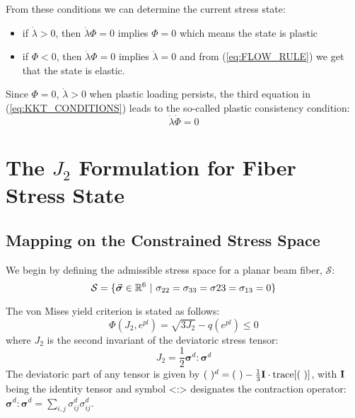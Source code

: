 From these conditions we can determine the current stress state:
\begin{itemize}
	\item if $\dot{\lambda}>0$, then $\dot{\lambda}\Phi=0$ implies $\Phi=0$ 
	which 
	means 
	the state is plastic
	\item if $\Phi<0$, then $\dot{\lambda}\Phi=0$ implies $\dot{\lambda}=0$ and 
	from 
	(\ref{eq:FLOW_RULE}) we get that the state is elastic.
\end{itemize}
Since $\Phi=0$, $\dot{\lambda}>0$ when plastic loading persists, the third 
equation
in (\ref{eq:KKT_CONDITIONS}) leads to the so-called plastic consistency
condition:
\begin{equation}
	\dot{\lambda}\dot{\Phi}=0
	\label{eq:PLASTIC_CONSISTENCY_CONDITION}
\end{equation}

\section{The \texorpdfstring{$J_2$}{text} Formulation for Fiber Stress 
State}\label{section:CH3-S3}

\subsection{Mapping on the Constrained Stress Space}\label{section:CH3-S3SS1}

We begin by defining the admissible stress space for a planar beam fiber, 
$\mathcal{S}$:
\begin{equation*}
	\mathcal{S} = \{\vec{\bm{\sigma}}\in\mathbb{R}^6\ |\
	\sigma_{22}=\sigma_{33}=\sigma{23}=\sigma_{13}=0\}
\end{equation*}

\noindent The von Mises yield criterion is stated as follows:
\begin{equation}
	\Phi(J_2,e^{pl}) = \sqrt{3J_2} - q(e^{pl}) \leq 0
	\label{eq:VON_MISES_FUNC}
\end{equation}
where $J_2$
is the second invariant of the deviatoric stress tensor:
\begin{equation}
	J_2 = \frac{1}{2}\bm{\sigma}^d:\bm{\sigma}^d
	\label{eq:J2}
\end{equation}
The deviatoric part of any tensor is given by $(\ )^d=(\ 
)-\frac{1}{3}\bmat{I}\cdot\text{trace}[(\ )]$, with $\mathbf{I}$ being the 
identity tensor and symbol <:> designates the contraction operator: 
$\bm{\sigma}^d:\bm{\sigma}^d = \sum_{i,j}\sigma_{ij}^d\sigma_{ij}^d$.

